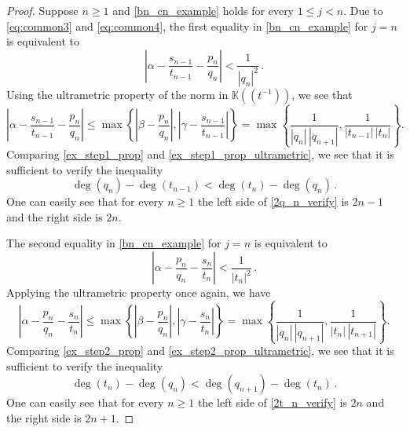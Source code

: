 \documentclass[a4paper,12pt]{article}
\def\fq{\bbk}
\def\fttt{\fq\!\left(\!\left(t^{-1}\right)\!\right)}
\def\bbk{\mathbb{K}}
\newcommand{\EN}[1]{
\begin{tcolorbox}[colback=orange,colframe=black]
   {\textbf{EN: #1}}
\end{tcolorbox}
}
\begin{document}
\begin{proof}
Suppose $n\geq1$ and \eqref{bn_cn_example} holds for every $1\leq j<n$. Due to \eqref{eq:common3} and \eqref{eq:common4}, the first equality in \eqref{bn_cn_example} for $j=n$ is equivalent to 
\begin{equation}
\label{ex_step1_prop}
\left|\alpha-\frac{s_{n-1}}{t_{n-1}}-\frac{p_n}{q_n}\right|<\frac{1}{|q_n|^2}\,.
\end{equation}
Using the ultrametric property of the norm in $\fttt$, we see that
\begin{equation}
\label{ex_step1_prop_ultrametric}
\left|\alpha-\frac{s_{n-1}}{t_{n-1}}-\frac{p_n}{q_n}\right|\le
\max\left\{\left|\beta-\frac{p_n}{q_n}\right|,\left|\gamma-\frac{s_{n-1}}{t_{n-1}}\right| \right\}=\max\left\{\frac{1}{|q_n|\,|q_{n+1}|}, \frac{1}{|t_{n-1}|\,|t_n|}\right\}.
\end{equation}
Comparing \eqref{ex_step1_prop} and \eqref{ex_step1_prop_ultrametric}, we see that it is sufficient to verify the inequality
\begin{equation}
\label{2q_n_verify}
\deg(q_n) - \deg(t_{n-1}) < \deg(t_n) - \deg(q_n) \,.
\end{equation}
One can easily see that for every $n\ge 1$ the left side of \eqref{2q_n_verify} is $2n-1$ and the right side is $2n$.

The second equality in \eqref{bn_cn_example} for $j=n$ is 
equivalent to
\begin{equation}
\label{ex_step2_prop}
\left|\alpha-\frac{p_{n}}{q_{n}}-\frac{s_n}{t_n}\right|<\frac{1}{|t_n|^2}\,.
\end{equation}
Applying the ultrametric property once again, we have
\begin{equation}
\label{ex_step2_prop_ultrametric}
\left|\alpha-\frac{p_{n}}{q_{n}}-\frac{s_n}{t_n}\right|\le
\max\left\{\left|\beta-\frac{p_n}{q_n}\right|,\left|\gamma-\frac{s_{n}}{t_{n}}\right| \right\}=\max\left\{\frac{1}{|q_n|\,|q_{n+1}|}, \frac{1}{|t_{n}|\,|t_{n+1}|}\right\}.
\end{equation}
Comparing \eqref{ex_step2_prop} and \eqref{ex_step2_prop_ultrametric}, we see that it is sufficient to verify the inequality
\begin{equation}
\label{2t_n_verify}
\deg(t_n) - \deg(q_n) < \deg(q_{n+1}) - \deg(t_n)\,.   
\end{equation}
One can easily see that for every $n\ge 1$ the left side of  \eqref{2t_n_verify} is $2n$ and the right side is $2n+1$.
\end{proof}
\end{document}
